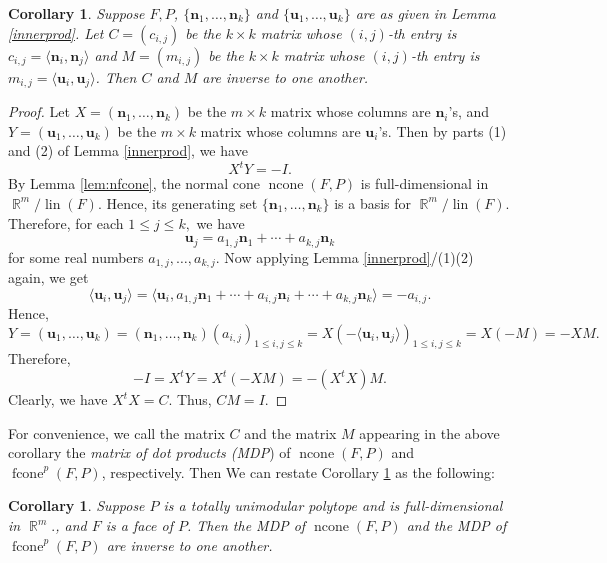 \documentclass[12pt]{amsart}
\numberwithin{equation}{section}
\newtheorem{cor}[thm]{Corollary}
\theoremstyle{definition}
\def\fcone{\operatorname{fcone}}
\def\ncone{\operatorname{ncone}}
\def\lin{\operatorname{lin}}
\def\bn{\boldsymbol{n}}
\def\bu{\boldsymbol{u}}
\def\R{\operatorname{\mathbb{R}}}
\begin{document}
\begin{cor} \label{CMinv}
  Suppose $F, P$, $\{\bn_1, \dots, \bn_k\}$ and $\{\bu_1, \dots, \bu_k\}$ are as given in Lemma \ref{innerprod}. Let $C=(c_{i,j})$ be the $k \times k$ matrix whose $(i,j)$-th entry is $c_{i,j}=\langle \bn_{i}, \bn_{j} \rangle$ and $M=(m_{i,j})$ be the $k \times k$ matrix whose $(i,j)$-th entry is $m_{i,j}=\langle \bu_{i}, \bu_{j} \rangle$. Then $C$ and $M$ are inverse to one another.
\end{cor}

\begin{proof}
	Let $X= (\bn_1, \dots, \bn_k)$ be the $m \times k$ matrix whose columns are $\bn_i$'s, and $Y = (\bu_1, \dots, \bu_k)$ be the $m \times k$ matrix whose columns are $\bu_i$'s.
	Then by parts (1) and (2) of Lemma \ref{innerprod}, we have \[ X^t Y = - I.\]
	By Lemma \ref{lem:nfcone}, the normal cone $\ncone(F,P)$ is full-dimensional in $\R^m/\lin(F).$ Hence, its generating set $\{\bn_1, \dots, \bn_k\}$ is a basis for $\R^m/\lin(F)$. Therefore, for each $1 \le j \le k,$ we have 
	\[ \bu_j = a_{1,j} \bn_1 + \cdots + a_{k,j} \bn_k\] for some real numbers $a_{1,j}, \dots, a_{k,j}.$ 
	Now applying Lemma \ref{innerprod}/(1)(2) again, we get
	\begin{equation} \label{method2}
		\langle \bu_{i}, \bu_{j} \rangle=\langle \bu_i, a_{1,j}\bn_{1}+\cdots+ a_{i,j}\bn_i + \cdots+a_{k,j}\bn_{k}\rangle = -a_{i,j}.
\end{equation}
Hence,	
	\[ Y=  (\bu_1, \dots, \bu_k) =(\bn_1, \dots, \bn_k) (a_{i,j})_{1 \le i, j\le k}  =  X \left(-\langle \bu_{i}, \bu_{j} \rangle\right)_{1 \le i, j\le k}=  X (-M) = - XM.\]
	Therefore,
\[ -I = X^t Y = X^t (-XM) = - (X^t X) M.\] 
Clearly, we have $X^t X = C$. Thus, $C M = I$.
\end{proof}

For convenience, we call the matrix $C$ and the matrix $M$ appearing in the above corollary the \emph{matrix of dot products (MDP}) of $\ncone(F,P)$ and $\fcone^p(F,P)$, respectively. Then We can restate Corollary \ref{CMinv} as the following:

\begin{cor}\label{CMinv-restate}
  Suppose $P$ is a totally unimodular polytope and is full-dimensional in $\R^m.$, and $F$ is a face of $P$. Then the MDP of $\ncone(F,P)$ and the MDP of $\fcone^p(F,P)$ are inverse to one another.
\end{cor}
\end{document}
